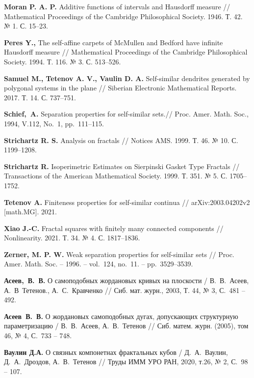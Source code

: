 \begin{thebibliography}{99}
{\bf Moran P. A. P. }
Additive functions of intervals and Hausdorff measure // 
Mathematical Proceedings of the Cambridge Philosophical Society. 1946. Т. 42. № 1. С. 15–23.

{\bf Peres Y.,}
The self-affine carpets of McMullen and Bedford have infinite Hausdorff measure // 
Mathematical Proceedings of the Cambridge Philosophical Society. 1994. Т. 116. № 3. С. 513--526.

{\bf Samuel M., Tetenov A. V., Vaulin D. A. }
Self-similar dendrites generated by polygonal systems in the plane //
Siberian Electronic Mathematical Reports. 2017. Т. 14. С. 737--751.

{\bf Schief,~A.}  Separation properties for self-similar sets.// 
Proc. Amer. Math. Soc., 1994, V.112, No.~1, pp.~111--115.

{\bf Strichartz R. S. }
Analysis on fractals // 
Notices AMS. 1999. Т. 46. № 10. С. 1199--1208.

{\bf Strichartz R. }
Isoperimetric Estimates on Sierpinski Gasket Type Fractals // 
Transactions of the American Mathematical Society. 1999. Т. 351. № 5. С. 1705--1752.

{\bf Tetenov A. }
Finiteness properties for self-similar continua // 
arXiv:2003.04202v2 [math.MG]. 2021.

{\bf Xiao J.-C. }
Fractal squares with finitely many connected components // 
Nonlinearity. 2021. Т. 34. № 4. С. 1817--1836.

{\bf Zerner, M. P. W.} 
Weak separation properties for self-similar sets // 
Proc. Amer. Math. Soc.  -- 1996. -- vol.~124, no.~11. -- pp.~3529--3539.


%
%
%
%
%
%
%
%
%
%
%

{\bf Асеев,~В.~В.} 
О самоподобных жордановых кривых на плоскости / 
В.~В.~Асеев, А.~В~Тетенов., А.~С.~Кравченко //
Сиб. мат. журн., 2003, Т. 44, № 3, С.~481 -- 492.

{\bf Асеев~В.~В.} 
О жордановых самоподобных дугах, допускающих структурную параметризацию /
В.~В.~Асеев, А.~В.~Тетенов //
Сиб. матем. журн. (2005), том 46, № 4, С.~733 -- 748.

{\bf Ваулин Д.А.}
О связных компонетнах фрактальных кубов / 
Д.~А.~Ваулин, Д.~А.~Дроздов, А.~В.~Тетенов //
Труды ИММ УРО РАН, 2020, т.26, № 2, С.~98 -- 107.


\end{thebibliography}

